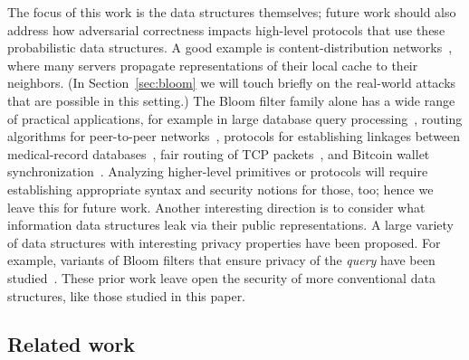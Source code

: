 %
The focus of this work is the data structures themselves; future work should
also address how adversarial correctness impacts high-level protocols that use
these probabilistic data structures. A good example is content-distribution
networks~\cite{byers2002informed}, where many servers propagate representations
of their local cache to their neighbors. (In Section~\ref{sec:bloom} we will
touch briefly on the real-world attacks that are possible in this setting.) The
Bloom filter family alone has a wide range of practical applications, for
example in large database query processing~\cite{broder2004network}, routing
algorithms for peer-to-peer networks~\cite{reynolds2003efficient}, protocols for
establishing linkages between medical-record databases~\cite{schnell2011novel},
fair routing of TCP packets~\cite{feng2001stochastic}, and Bitcoin wallet
synchronization~\cite{gervais2014privacy}.
%
Analyzing higher-level primitives or protocols will require establishing
appropriate syntax and security notions for those, too; hence we leave this for
future work.
%
Another interesting direction is to consider what information data structures
leak via their public representations. A large variety of data structures with
interesting privacy properties have been proposed. For example, variants of
Bloom filters that ensure privacy of the \emph{query} have been
studied~\cite{bellovin2004privacy,nojima2009cryptographically}. These prior work
leave open the security of more conventional data structures, like those studied
in this paper.

\subsection{Related work}



